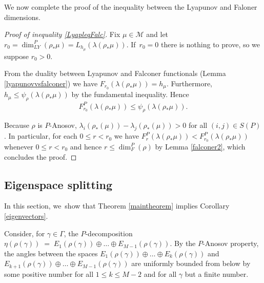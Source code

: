 \documentclass[10pt]{amsart}
\let\G\Gamma
\let\g\gamma
\let\la\lambda
\begin{document}
We now complete the proof of the inequality between the Lyapunov and Faloner dimensions.

\begin{proof}[Proof of inequality \eqref{LyapleqFalc}]
Fix \(\mu \!\in\! \mathcal{M}\) and let \(r_0 \!=\! \dim_{LY}^P(\rho_\ast \mu) \!=\! L_{h_\mu}(\lambda(\rho_*\mu))\). If~\hbox{\(r_0 = 0\)} there is nothing to prove, so we suppose \(r_0 > 0\).

From the duality between Lyapunov and Falconer functionals (Lemma \ref{lyapunovvsfalconer}) we have
\(F_{r_0}(\lambda(\rho_*\mu)) = h_\mu\). Furthermore, \(h_\mu \le \psi_{\rho}(\lambda(\rho_{*}\mu)) \) by the fundamental inequality. Hence
\[
F_{r_0}^P(\la(\rho_*\mu)) \le \psi_\rho (\la(\rho_*\mu)).
\]

Because \(\rho\) is \(P\)-Anosov, \(\lambda_i(\rho_*(\mu)) - \lambda_j(\rho_*(\mu)) > 0\) for all \((i,j) \in S(P)\). In particular, for each \(0\le r < r_0\) we have \(F_{r}^P(\la(\rho_*\mu)) < F_{r_0}^P(\la(\rho_*\mu))\) whenever \(0 \le r < r_0\) and hence
\(r \le \dim_F^P(\rho) \) by Lemma \ref{falconer2}, which concludes the proof.
\end{proof}

\subsection{Eigenspace splitting}\label{splitting}

In this section, we~show that Theorem \ref{maintheorem} implies Corollary \ref{eigenvectors}.

Consider, for \(\g \in \G\), the \(P\)-decomposition \(\eta (\rho (\g)) \; = \; E_1(\rho (\g)) \oplus \ldots \oplus E_{M-1} (\rho (\g)) \).
By the \(P\)-Anosov property, the angles between the spaces \(E_1(\rho (\g)) \oplus \ldots \oplus E_{k}(\rho (\g)) \) and \(E_{k+1}(\rho (\g)) \oplus \ldots \oplus E_{M-1}(\rho (\g)) \) are uniformly bounded from below by some positive number for all \(1\le k \le M-2\) and for all \(\g\) but a finite number.
\end{document}
